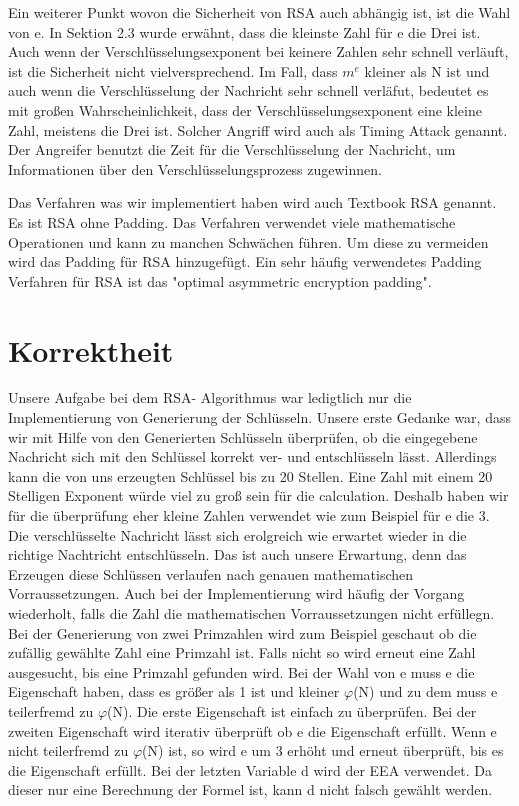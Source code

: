 \documentclass[course=asp]{aspdoc}
\begin{document}
Ein weiterer Punkt wovon die Sicherheit von RSA auch abhängig ist, ist die Wahl von e. In Sektion 2.3 wurde erwähnt, dass die kleinste Zahl für e die Drei ist. Auch wenn der Verschlüsselungsexponent bei keinere Zahlen sehr schnell verläuft, ist die Sicherheit nicht vielversprechend. Im Fall, dass $m^{e}$ kleiner als N ist und auch wenn die Verschlüsselung der Nachricht sehr schnell verläfut, bedeutet es mit großen Wahrscheinlichkeit, dass der Verschlüsselungsexponent eine kleine Zahl, meistens die Drei ist. Solcher Angriff wird auch als Timing Attack genannt. Der Angreifer benutzt die Zeit für die Verschlüsselung der Nachricht, um Informationen über den Verschlüsselungsprozess zugewinnen. \cite{TheRSAAlgorithm}

Das Verfahren was wir implementiert haben wird auch Textbook RSA genannt. Es ist RSA ohne Padding. Das Verfahren verwendet viele mathematische Operationen und kann zu manchen Schwächen führen. Um diese zu vermeiden wird das Padding für RSA hinzugefügt.  Ein sehr häufig verwendetes Padding Verfahren für RSA ist das "optimal asymmetric encryption padding". \cite{DefinitionoftextbookRSA}




\section{Korrektheit}
Unsere Aufgabe bei dem RSA- Algorithmus war ledigtlich nur die Implementierung von Generierung der Schlüsseln. Unsere erste Gedanke war, dass wir mit Hilfe von den Generierten Schlüsseln überprüfen, ob die eingegebene Nachricht sich mit den Schlüssel korrekt ver- und entschlüsseln lässt. Allerdings kann die von uns erzeugten Schlüssel bis zu 20 Stellen. Eine Zahl mit einem 20 Stelligen Exponent würde viel zu groß sein für die calculation. Deshalb haben wir für die überprüfung eher kleine Zahlen verwendet wie zum Beispiel für e die 3. Die verschlüsselte Nachricht lässt sich erolgreich wie erwartet wieder in die richtige Nachtricht entschlüsseln. Das ist auch unsere Erwartung, denn das Erzeugen diese Schlüssen verlaufen nach genauen mathematischen Vorraussetzungen. Auch bei der Implementierung wird häufig der Vorgang wiederholt, falls die Zahl die mathematischen Vorraussetzungen nicht erfüllegn. Bei der Generierung von zwei Primzahlen wird zum Beispiel geschaut ob die zufällig gewählte Zahl eine Primzahl ist. Falls nicht so wird erneut eine Zahl ausgesucht, bis eine Primzahl gefunden wird. Bei der Wahl von e muss e die Eigenschaft haben, dass es größer als 1 ist und kleiner $\varphi $(N) und zu dem muss e teilerfremd zu $\varphi $(N). Die erste Eigenschaft ist einfach zu überprüfen. Bei der zweiten Eigenschaft wird iterativ überprüft ob e die Eigenschaft erfüllt. Wenn e nicht teilerfremd zu $\varphi $(N) ist, so wird e um 3 erhöht und erneut überprüft, bis es die Eigenschaft erfüllt. Bei der letzten Variable d wird der EEA verwendet. Da dieser nur eine Berechnung der Formel ist, kann d nicht falsch gewählt werden.
\end{document}
